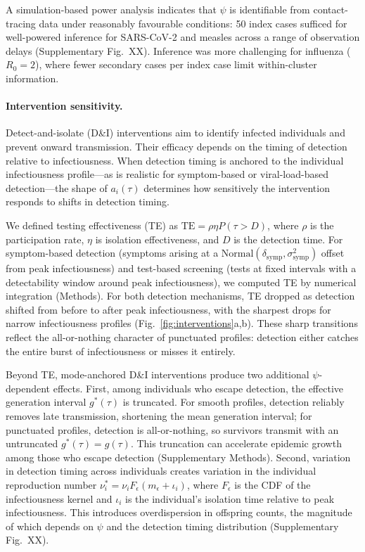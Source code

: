 A simulation-based power analysis indicates that $\psi$ is identifiable from contact-tracing data under reasonably favourable conditions: 50 index cases sufficed for well-powered inference for SARS-CoV-2 and measles across a range of observation delays (Supplementary Fig.~XX). Inference was more challenging for influenza ($R_0 = 2$), where fewer secondary cases per index case limit within-cluster information.

\paragraph{Intervention sensitivity.}
Detect-and-isolate (D\&I) interventions aim to identify infected individuals and prevent onward transmission. Their efficacy depends on the timing of detection relative to infectiousness. When detection timing is anchored to the individual infectiousness profile---as is realistic for symptom-based or viral-load-based detection---the shape of $a_i(\tau)$ determines how sensitively the intervention responds to shifts in detection timing.

We defined testing effectiveness (TE) as $\text{TE} = \rho \eta P(\tau > D)$, where $\rho$ is the participation rate, $\eta$ is isolation effectiveness, and $D$ is the detection time\citep{middleton_modeling_2024}. For symptom-based detection (symptoms arising at a $\text{Normal}(\delta_\text{symp}, \sigma_\text{symp}^2)$ offset from peak infectiousness) and test-based screening (tests at fixed intervals with a detectability window around peak infectiousness), we computed TE by numerical integration (Methods). For both detection mechanisms, TE dropped as detection shifted from before to after peak infectiousness, with the sharpest drops for narrow infectiousness profiles (Fig.~\ref{fig:interventions}a,b). These sharp transitions reflect the all-or-nothing character of punctuated profiles: detection either catches the entire burst of infectiousness or misses it entirely.

Beyond TE, mode-anchored D\&I interventions produce two additional $\psi$-dependent effects. First, among individuals who escape detection, the effective generation interval $g^*(\tau)$ is truncated. For smooth profiles, detection reliably removes late transmission, shortening the mean generation interval; for punctuated profiles, detection is all-or-nothing, so survivors transmit with an untruncated $g^*(\tau) = g(\tau)$. This truncation can accelerate epidemic growth among those who escape detection (Supplementary Methods). Second, variation in detection timing across individuals creates variation in the individual reproduction number $\nu_i^* = \nu_i F_\epsilon(m_\epsilon + \iota_i)$, where $F_\epsilon$ is the CDF of the infectiousness kernel and $\iota_i$ is the individual's isolation time relative to peak infectiousness. This introduces overdispersion in offspring counts, the magnitude of which depends on $\psi$ and the detection timing distribution (Supplementary Fig.~XX).

